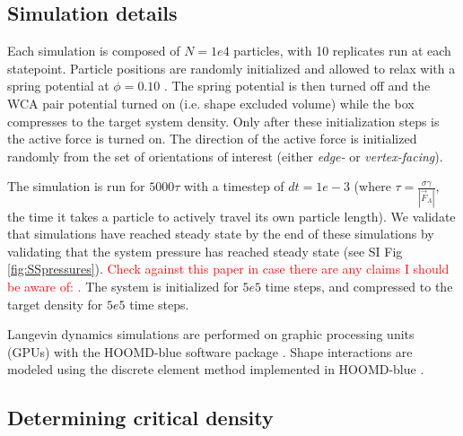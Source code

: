 \subsection*{Simulation details}

Each simulation is composed of $N=1e4$ particles, with 10 replicates run at each statepoint.
Particle positions are randomly initialized and allowed to relax with a spring potential at $\phi=0.10$ \cite{DPD_2011}.
The spring potential is then turned off and the WCA pair potential turned on (i.e. shape excluded volume) while the box compresses to the target system density.
Only after these initialization steps is the active force is turned on.
The direction of the active force is initialized randomly from the set of orientations of interest (either \textit{edge-} or \textit{vertex-facing}).

The simulation is run for $5000\tau$ with a timestep of $dt=1e-3$ (where $\tau = \frac{\sigma\gamma}{|\vec{F}_A|}$, the time it takes a particle to actively travel its own particle length).
We validate that simulations have reached steady state by the end of these simulations by validating that the system pressure has reached steady state (see SI Fig \ref{fig:SSpressures}).
\textcolor{red}{Check against this paper in case there are any claims I should be aware of: \cite{SolonEA_2015_NaturePhysics}.}
The system is initialized for $5e5$ time steps, and compressed to the target density for $5e5$ time steps.

Langevin dynamics simulations are performed on graphic processing units (GPUs) with the HOOMD-blue software package \cite{HOOMD_2008, HOOMD_2015}.
Shape interactions are modeled using the discrete element method implemented in HOOMD-blue \cite{DEM_2017}.



\subsection*{Determining critical density}


